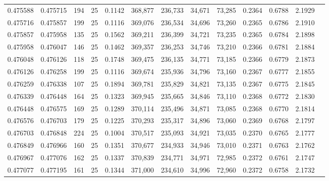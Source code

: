 \begin{tabular}{rrrrrrrrrrrrr}
0.475588 & 0.475715 &   194 &  25 &                                     0.1142 & 368,877 & 236,733 &  34,671 &  73,285 & 0.2364 & 0.6788 & 2.1929 \\
0.475716 & 0.475857 &   199 &  25 &                                     0.1116 & 369,076 & 236,534 &  34,696 &  73,260 & 0.2365 & 0.6786 & 2.1910 \\
0.475857 & 0.475958 &   135 &  25 &                                     0.1562 & 369,211 & 236,399 &  34,721 &  73,235 & 0.2365 & 0.6784 & 2.1898 \\
0.475958 & 0.476047 &   146 &  25 &                                     0.1462 & 369,357 & 236,253 &  34,746 &  73,210 & 0.2366 & 0.6781 & 2.1884 \\
0.476048 & 0.476126 &   118 &  25 &                                     0.1748 & 369,475 & 236,135 &  34,771 &  73,185 & 0.2366 & 0.6779 & 2.1873 \\
0.476126 & 0.476258 &   199 &  25 &                                     0.1116 & 369,674 & 235,936 &  34,796 &  73,160 & 0.2367 & 0.6777 & 2.1855 \\
0.476259 & 0.476338 &   107 &  25 &                                     0.1894 & 369,781 & 235,829 &  34,821 &  73,135 & 0.2367 & 0.6775 & 2.1845 \\
0.476339 & 0.476448 &   164 &  25 &                                     0.1323 & 369,945 & 235,665 &  34,846 &  73,110 & 0.2368 & 0.6772 & 2.1830 \\
0.476448 & 0.476575 &   169 &  25 &                                     0.1289 & 370,114 & 235,496 &  34,871 &  73,085 & 0.2368 & 0.6770 & 2.1814 \\
0.476576 & 0.476703 &   179 &  25 &                                     0.1225 & 370,293 & 235,317 &  34,896 &  73,060 & 0.2369 & 0.6768 & 2.1797 \\
0.476703 & 0.476848 &   224 &  25 &                                     0.1004 & 370,517 & 235,093 &  34,921 &  73,035 & 0.2370 & 0.6765 & 2.1777 \\
0.476849 & 0.476966 &   160 &  25 &                                     0.1351 & 370,677 & 234,933 &  34,946 &  73,010 & 0.2371 & 0.6763 & 2.1762 \\
0.476967 & 0.477076 &   162 &  25 &                                     0.1337 & 370,839 & 234,771 &  34,971 &  72,985 & 0.2372 & 0.6761 & 2.1747 \\
0.477077 & 0.477195 &   161 &  25 &                                     0.1344 & 371,000 & 234,610 &  34,996 &  72,960 & 0.2372 & 0.6758 & 2.1732 \\

\end{tabular}
